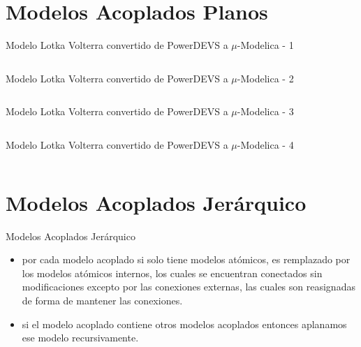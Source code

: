 \documentclass{beamer}
\begin{document}
\section{Modelos Acoplados Planos}
\begin{frame}[fragile]{Modelo Lotka Volterra convertido de PowerDEVS a $\mu$-Modelica - 1}
        \inputminted[linenos,breaklines=true,lastline=9]{modelica}{src/lotka_volterra-orig.mo}
\end{frame}

\begin{frame}[fragile]{Modelo Lotka Volterra convertido de PowerDEVS a $\mu$-Modelica - 2}
        \inputminted[linenos,breaklines=true,firstline=10,lastline=16]{modelica}{src/lotka_volterra-orig.mo}
\end{frame}

\begin{frame}[fragile]{Modelo Lotka Volterra convertido de PowerDEVS a $\mu$-Modelica - 3}
        \inputminted[linenos,breaklines=true,firstline=17,lastline=21]{modelica}{src/lotka_volterra-orig.mo}
\end{frame}

\begin{frame}[fragile]{Modelo Lotka Volterra convertido de PowerDEVS a $\mu$-Modelica - 4}
        \inputminted[linenos,breaklines=true,firstline=22]{modelica}{src/lotka_volterra-orig.mo}
\end{frame}


\section{Modelos Acoplados Jerárquico}
\begin{frame}[fragile]{Modelos Acoplados Jerárquico}
        \begin{itemize}
                \item<1-> por cada modelo acoplado si solo tiene modelos atómicos, es remplazado por los modelos atómicos internos, los cuales se encuentran conectados 
                        sin modificaciones excepto por las conexiones externas, las cuales son reasignadas de forma de mantener las conexiones.
                \item<2-> si el modelo acoplado contiene otros modelos acoplados entonces aplanamos ese modelo recursivamente.
        \end{itemize} 
\end{frame}
\end{document}
